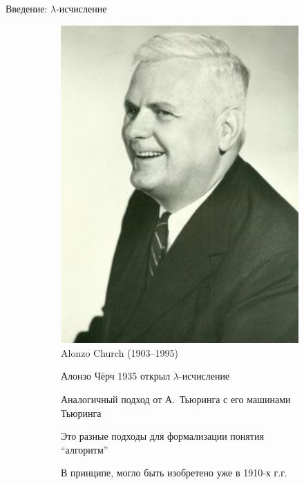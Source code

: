 

\begin{frame}{Введение: $\lambda$-исчисление}
  \begin{figure}
    \centering
    \begin{subfigure}[t]{0.45\textwidth}
      \begin{minipage}{0.7\textwidth}
      \includegraphics[width=1\textwidth]{220px-Alonzo_Church.jpg}\\
            Alonzo Church (1903--1995)
      \end{minipage}
    \end{subfigure}
    \begin{subfigure}[t]{0.45\textwidth}
      \vspace{-5em}   %
  Алонзо Чёрч 1935   открыл $\lambda$-исчисление
\vspace{1em}

Аналогичный подход от А.~Тьюринга с его машинами Тьюринга
\vspace{1em}

Это разные подходы для формализации понятия ``алгоритм''
\vspace{1em}

В принципе, могло быть изобретено уже в 1910-х г.г.

    \end{subfigure}
  \end{figure}

\end{frame}



